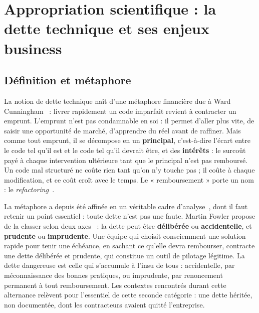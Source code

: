 \chapter{Appropriation scientifique : la dette technique et ses enjeux business}
\label{chap:veille}


\section{Définition et métaphore}
La notion de dette technique naît d'une métaphore financière due à Ward
Cunningham~\cite{cunningham1992} : livrer rapidement un code imparfait
revient à contracter un emprunt. L'emprunt n'est pas condamnable en soi : il
permet d'aller plus vite, de saisir une opportunité de marché, d'apprendre du
réel avant de raffiner. Mais comme tout emprunt, il se décompose en un
\textbf{principal}, c'est-à-dire l'écart entre le code tel qu'il est et le
code tel qu'il devrait être, et des \textbf{intérêts} : le surcoût payé à chaque
intervention ultérieure tant que le principal n'est pas remboursé. Un code
mal structuré ne coûte rien tant qu'on n'y touche pas ; il coûte à chaque
modification, et ce coût croît avec le temps. Le « remboursement » porte un
nom : le \emph{refactoring}~\cite{fowler2018}.

La métaphore a depuis été affinée en un véritable cadre
d'analyse~\cite{kruchten2012}, dont il faut retenir un point essentiel :
toute dette n'est pas une faute. Martin Fowler propose de la classer selon
deux axes~\cite{fowler2009} : la dette peut être \textbf{délibérée} ou
\textbf{accidentelle}, et \textbf{prudente} ou \textbf{imprudente}. Une
équipe qui choisit consciemment une solution rapide pour tenir une échéance,
en sachant ce qu'elle devra rembourser, contracte une dette délibérée et
prudente, qui constitue un outil de pilotage légitime. La dette dangereuse est celle qui
s'accumule à l'insu de tous : accidentelle, par méconnaissance des bonnes
pratiques, ou imprudente, par renoncement permanent à tout remboursement.
Les contextes rencontrés durant cette alternance relèvent pour l'essentiel
de cette seconde catégorie : une dette héritée, non documentée, dont les
contracteurs avaient quitté l'entreprise.

